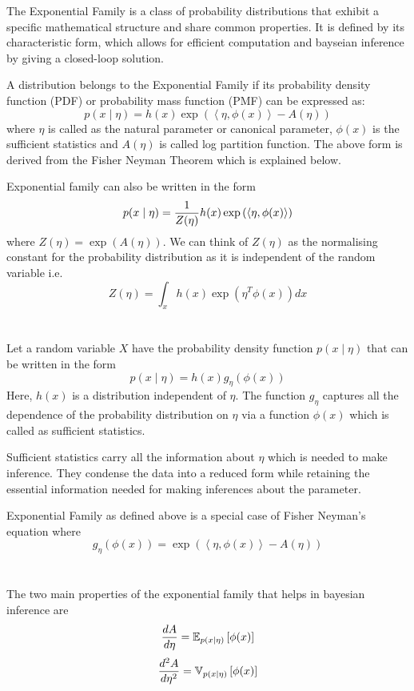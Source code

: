 \documentclass{homework}
\begin{document}
The Exponential Family is a class of probability distributions that exhibit a specific mathematical structure and share common properties. It is defined by its characteristic form, which allows for efficient computation and bayseian inference by giving a closed-loop solution.

A distribution belongs to the Exponential Family if its probability density function (PDF) or probability mass function (PMF) can be expressed as:
$$
p(x\mid \eta) = h(x)\exp \left(\left\langle \eta, \phi(x)\right\rangle - A(\eta)\right)
$$
where $\eta$ is called as the natural parameter or canonical parameter, $\phi(x)$ is the sufficient statistics and $A(\eta)$ is called log partition function. The above form is derived from the Fisher Neyman Theorem which is explained below.

Exponential family can also be written in the form
$$
p(x\mid \eta) = {1\over Z(\eta)}h(x)\exp \left(\left\langle \eta, \phi(x)\right\rangle \right)
$$
where $Z(\eta) = \exp(A(\eta))$. We can think of $Z(\eta)$ as the normalising constant for the probability distribution as it is independent of the random variable i.e.
$$
Z(\eta) = \int_x h(x) \exp\left(\eta^T \phi(x)\right) dx
$$

\section{}
Let a random variable $X$ have the probability density function $p(x\mid \eta)$ that can be written in the form 
$$
p(x\mid \eta) = h(x) g_\eta(\phi(x))
$$
Here, $h(x)$ is a distribution independent of $\eta$. The function $g_\eta$ captures all the dependence of the probability distribution on $\eta$ via a function $\phi(x)$ which is called as sufficient statistics.

Sufficient statistics carry all the information about $\eta$ which is needed to make inference. They condense the data into a reduced form while retaining the essential information needed for making inferences about the parameter. 

Exponential Family as defined above is a special case of Fisher Neyman's equation where 
$$
g_\eta(\phi(x)) = \exp \left(\left\langle \eta, \phi(x)\right\rangle - A(\eta)\right)
$$


\section{}
The two main properties of the exponential family that helps in bayesian inference are 
$${d A \over d \eta} = \mathbb{E}_{p(x\mid \eta)}\left[\phi(x)\right]$$
$${d^2 A \over d \eta^2} = \mathbb{V}_{p(x\mid \eta)}\left[\phi(x)\right]$$
\end{document}
